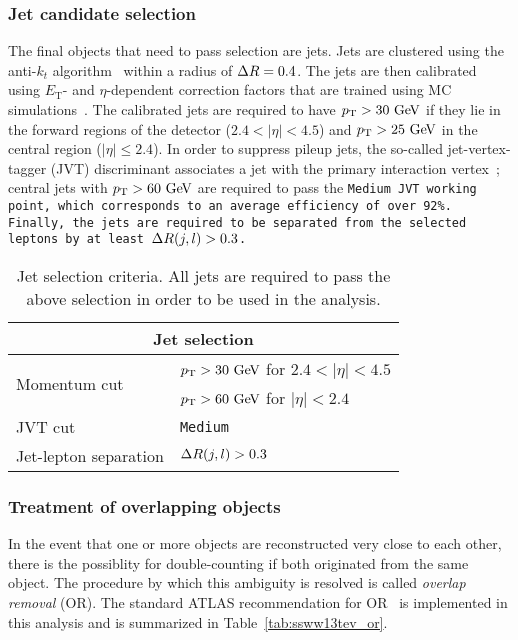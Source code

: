 

\subsubsection{Jet candidate selection}
The final objects that need to pass selection are jets.
Jets are clustered using the anti-$k_t$ algorithm~\cite{2008.antikt} within a radius of $\Delta R = 0.4$.
The jets are then calibrated using $E_\textrm{T}$- and $\eta$-dependent correction factors that are trained using MC simulations~\cite{2017.jet-energy-scale-13tev}.
The calibrated jets are required to have $\pt > 30\gev$ if they lie in the forward regions of the detector ($2.4 < |\eta| < 4.5$) and $\pt > 25\gev$ in the central region ($|\eta| \le 2.4$).
In order to suppress pileup jets, the so-called jet-vertex-tagger (JVT) discriminant associates a jet with the primary interaction vertex~\cite{2014.jet-vertex-tagger}; central jets with $\pt > 60\gev$ are required to pass the \tt{Medium} JVT working point, which corresponds to an average efficiency of over 92\%. %
Finally, the jets are required to be separated from the selected leptons by at least $\Delta R(j,l) > 0.3$.

\begin{table}[htbp]
  \centering
  \begin{tabular}{l l}
    \multicolumn{2}{c}{Jet selection} \\ 
    \hline\hline
    \multirow{2}{*}{Momentum cut} & $\pt > 30\gev$ for $2.4 < |\eta| < 4.5$ \\
                                  & $\pt > 60\gev$ for $|\eta| < 2.4$ \\
    JVT cut                       & \tt{Medium}\\
    Jet-lepton separation         & $\Delta R(j,l) > 0.3$ \\
    \hline
  \end{tabular}
  \caption{Jet selection criteria.  All jets are required to pass the above selection in order to be used in the analysis.}
  \label{tab:ssww13tev_jet_selection}
\end{table}

\subsubsection{Treatment of overlapping objects}\label{ssww13tev:overlap_removal}
In the event that one or more objects are reconstructed very close to each other, there is the possiblity for double-counting if both originated from the same object.
The procedure by which this ambiguity is resolved is called \emph{overlap removal} (OR).
The standard ATLAS recommendation for OR~\cite{2014.atlas-overlap-removal, 2018.atlas-wboson-top} is implemented in this analysis and is summarized in Table~\ref{tab:ssww13tev_or}.

